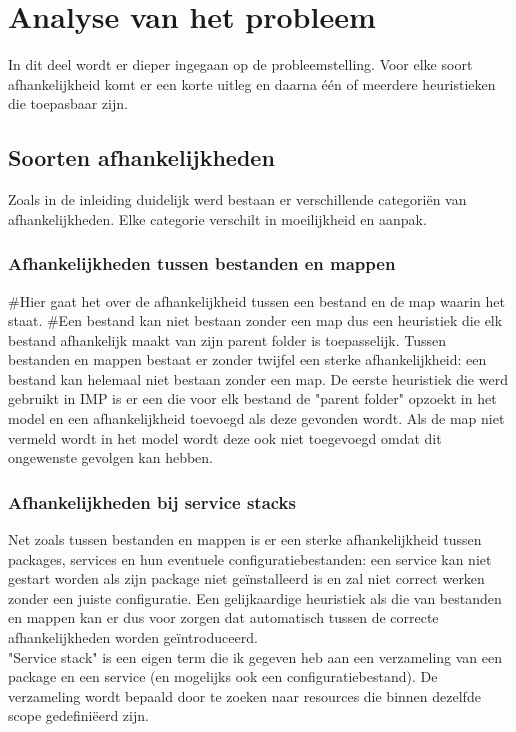 \chapter{Analyse van het probleem}
\label{chapter:1}
In dit deel wordt er dieper ingegaan op de probleemstelling.
Voor elke soort afhankelijkheid komt er een korte uitleg en daarna \'e\'en of meerdere heuristieken die toepasbaar zijn.

\section{Soorten afhankelijkheden}
\label{section:soorten_afhankelijkheden}
Zoals in de inleiding duidelijk werd bestaan er verschillende categori\"en van afhankelijkheden.
Elke categorie verschilt in moeilijkheid en aanpak. 

\subsection{Afhankelijkheden tussen bestanden en mappen}
\label{subs:bestanden_en_mappen}
#Hier gaat het over de afhankelijkheid tussen een bestand en de map waarin het staat.
#Een bestand kan niet bestaan zonder een map dus een heuristiek die elk bestand afhankelijk maakt van zijn parent folder is toepasselijk.
Tussen bestanden en mappen bestaat er zonder twijfel een sterke afhankelijkheid: een bestand kan helemaal niet bestaan zonder een map.
De eerste heuristiek die werd gebruikt in IMP is er een die voor elk bestand de "parent folder" opzoekt in het model en een afhankelijkheid toevoegd als deze gevonden wordt.
Als de map niet vermeld wordt in het model wordt deze ook niet toegevoegd omdat dit ongewenste gevolgen kan hebben. 

\subsection{Afhankelijkheden bij service stacks}
\label{subs:service_stacks}
Net zoals tussen bestanden en mappen is er een sterke afhankelijkheid tussen packages, services en hun eventuele configuratiebestanden:
een service kan niet gestart worden als zijn package niet ge\"installeerd is en zal niet correct werken zonder een juiste configuratie.
Een gelijkaardige heuristiek als die van bestanden en mappen kan er dus voor zorgen dat automatisch tussen de correcte afhankelijkheden worden ge\"introduceerd.
\\
"Service stack" is een eigen term die ik gegeven heb aan een verzameling van een package en een service (en mogelijks ook een configuratiebestand).
De verzameling wordt bepaald door te zoeken naar resources die binnen dezelfde scope gedefini\"eerd zijn.

